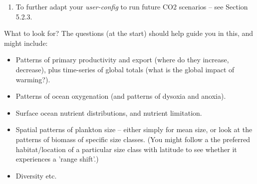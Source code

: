 \begin{enumerate}[noitemsep]
\begin{itemize}[noitemsep]
\vspace{1mm}
\item Under \texttt{\small \# *** FORCINGS ***} and in place of any existing forcing lines:
\vspace{-1mm}\small\begin{verbatim}
# historical forcing of pCO2
bg_par_forcing_name='pyyyyz.RpCO2_Rp13CO2.historical2010'
\end{verbatim}\normalsize\vspace{-1mm}
This prescribes increasing atmospheric CO2 following historical observations.

\vspace{1mm}
\item And then under \texttt{\small \# *** MISC ***}:
\vspace{-1mm}\small\begin{verbatim}
# change start year
bg_par_misc_t_start=1765.0
\end{verbatim}\normalsize\vspace{-1mm}
Starts the experiment at year 1765.

\end{itemize}

Run this experiments, starting form the end of your \textit{spin-up}, for 245 years, which will take it up until year 2010.

\vspace{2mm}
\item To further adapt your \textit{user-config} to run future CO2 scenarios -- see Section 5.2.3.

\end{enumerate}

\newpage

\noindent What to look for? The questions (at the start) should help guide you in this, and might include:

\vspace{1mm}
\begin{itemize}[noitemsep]
\item Patterns of primary productivity and export (where do they increase, decrease), plus time-series of global totals (what is the global impact of warming?).
\item Patterns of ocean oxygenation (and patterns of dysoxia and anoxia).
\item Surface ocean nutrient distributions, and nutrient limitation.
\item Spatial patterns of plankton size -- either simply for mean size, or look at the patterns of biomass of specific size classes. (You might follow a the preferred habitat/location of a particular size class with latitude to see whether it experiences a 'range shift'.)
\item Diversity etc.
\end{itemize}

